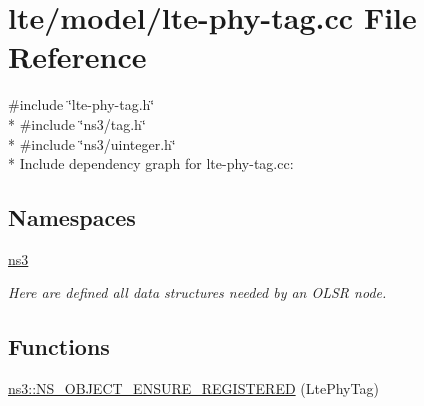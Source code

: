 \hypertarget{lte-phy-tag_8cc}{}\section{lte/model/lte-\/phy-\/tag.cc File Reference}
\label{lte-phy-tag_8cc}
{\ttfamily \#include \char`\"{}lte-\/phy-\/tag.\+h\char`\"{}}\\*
{\ttfamily \#include \char`\"{}ns3/tag.\+h\char`\"{}}\\*
{\ttfamily \#include \char`\"{}ns3/uinteger.\+h\char`\"{}}\\*
Include dependency graph for lte-\/phy-\/tag.cc\+:
\subsection*{Namespaces}
\begin{DoxyCompactItemize}
\item 
 \hyperlink{namespacens3}{ns3}
\begin{DoxyCompactList}\small\item\em Here are defined all data structures needed by an O\+L\+SR node. \end{DoxyCompactList}\end{DoxyCompactItemize}
\subsection*{Functions}
\begin{DoxyCompactItemize}
\item 
\hyperlink{namespacens3_ad1a71049a37a9f40eb8c596d97bba05a}{ns3\+::\+N\+S\+\_\+\+O\+B\+J\+E\+C\+T\+\_\+\+E\+N\+S\+U\+R\+E\+\_\+\+R\+E\+G\+I\+S\+T\+E\+R\+ED} (Lte\+Phy\+Tag)
\end{DoxyCompactItemize}
